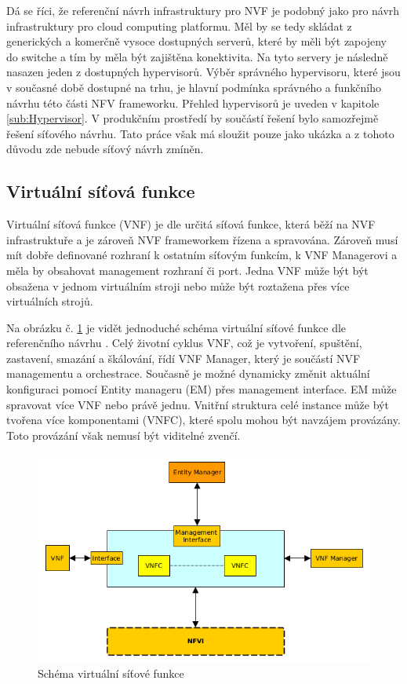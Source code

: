 Dá se říci, že referenční návrh infrastruktury pro NVF je podobný jako pro návrh infrastruktury pro cloud computing platformu. Měl by se tedy skládat z generických a komerčně vysoce dostupných serverů, které by měli být zapojeny do switche a tím by měla být zajištěna konektivita. Na tyto servery je následně nasazen jeden z dostupných hypervisorů. Výběr správného hypervisoru, které jsou v současné době dostupné na trhu, je hlavní podmínka správného a funkčního návrhu této části NFV frameworku. Přehled hypervisorů je uveden v kapitole \ref{sub:Hypervisor}. V produkčním prostředí by součástí řešení bylo samozřejmě řešení síťového návrhu. Tato práce však má sloužit pouze jako ukázka a z tohoto důvodu zde nebude síťový návrh zmíněn.

\subsection{Virtuální síťová funkce}

Virtuální síťová funkce (VNF) je dle \cite{NFV_VNF} určitá síťová funkce, která běží na NVF infrastruktuře a je zároveň NVF frameworkem řízena a spravována. Zároveň musí mít dobře definované rozhraní k ostatním síťovým funkcím, k VNF Managerovi a měla by obsahovat management rozhraní či port. Jedna VNF může být být obsažena v jednom virtuálním stroji nebo může být roztažena přes více virtuálních strojů. 

Na obrázku č. \ref{fig:VNF} je vidět jednoduché schéma virtuální síťové funkce dle referenčního návrhu \cite{NFV_VNF}. Celý životní cyklus VNF, což je vytvoření, spuštění, zastavení, smazání a škálování, řídí VNF Manager, který je součástí NVF managementu a orchestrace. Současně je možné dynamicky změnit aktuální konfiguraci pomocí Entity manageru (EM) přes management interface. EM může spravovat více VNF nebo právě jednu. Vnitřní struktura celé instance může být tvořena více komponentami (VNFC), které spolu mohou být navzájem provázány. Toto provázání však nemusí být viditelné zvenčí.

\begin{figure}[h]
\begin{centering}
\includegraphics[scale=0.67]{images/VNF}
\par\end{centering}
\caption{Schéma virtuální síťové funkce\label{fig:VNF}}
\end{figure}

